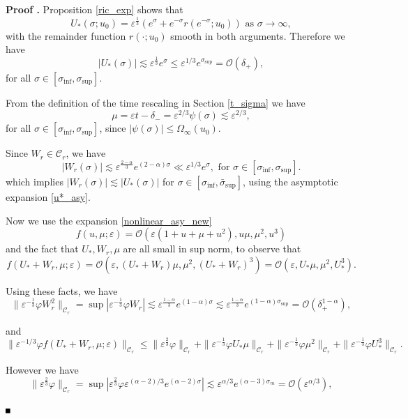 \documentclass[letterpaper,11pt]{article}
\newcommand{\rmO}{\mathcal{O}}
\newcommand{\eps}{\varepsilon}
\newcommand{\lar}{ \lesssim }
\numberwithin{equation}{section}
\theoremstyle{plain}
\newenvironment{Proof}[1][\unskip]%
 {\begin{trivlist} \item[]{\bf Proof #1. }}%
 {\hspace*{\fill}$\rule{.4\baselineskip}{.4\baselineskip}$\end{trivlist}}
\begin{document}
\begin{Proof} Proposition \ref{ric_exp} shows that
\begin{equation} \label{u*_asy}
U_*(\sigma;u_0) =  \eps^{\frac{1}{3}}(e^\sigma+e^{-\sigma} r(e^{-\sigma}; u_0)   ) \text{ as }\sigma \to \infty,
\end{equation}
with the remainder function $r(\cdot;u_0)$ smooth in both arguments.
Therefore we have
\[
|U_*(\sigma)| \lar \eps^{\frac{1}{3}}e^\sigma \le \eps^{1/3}e^{\sigma_{\sup}} = \rmO(\delta_+),
\]
for all $\sigma \in [\sigma_{\inf},\sigma_{\sup}]$.

From the definition of the time rescaling in Section \ref{t_sigma} we have
\[
\mu = \eps t-\delta_-  =\eps^{2/3}\psi(\sigma) \lar \eps^{2/3},
\]
for all $\sigma \in [\sigma_{\inf},\sigma_{\sup}]$, since $|\psi(\sigma)| \le \Omega_\infty(u_0)$.

Since $W_r \in \mathcal{C}_r$, we have 
\[
|W_r(\sigma)| \lar \eps^{\frac{2-\alpha}{3}} e^{(2-\alpha)\sigma} \ll \eps^{1/3}e^\sigma, \text{ for } \sigma \in [\sigma_{\inf}, \sigma_{\sup}].
\]
which implies $|W_r(\sigma)| \lar |U_*(\sigma)|$ for $\sigma \in [\sigma_{\inf}, \bar{\sigma}_{\sup}]$, using the asymptotic expansion \eqref{u*_asy}.

Now we use the expansion \eqref{nonlinear_asy_new}
\[
f(u,\mu; \eps) = \rmO(\eps(1+u+\mu+u^2),u\mu,\mu^2,u^3)
\] 
and the fact that $U_*,W_r,\mu$ are all small in sup norm, to observe that
\begin{equation}\label{nonlinear_asy:fr}
f(U_*+W_r, \mu ;\eps) = \rmO(\eps, (U_*+W_r)\mu, \mu^2, (U_*+W_r)^3 ) = \rmO(\eps, U_*\mu, \mu^2, U_*^3).
\end{equation}

Using these facts, we have
\begin{equation}\label{nl_est:Rr_1}
\|\eps^{-\frac{1}{3}}\varphi W_r^2\|_{\mathcal{C}_r}=\sup |\eps^{-\frac{1}{3}} \varphi W_r| \lar \eps^{\frac{1-\alpha}{3}} e^{(1-\alpha)\sigma} \lar \eps^{\frac{1-\alpha}{3}} e^{(1-\alpha)\sigma_{\sup}} =  \rmO(\delta^{1-\alpha}_+),
\end{equation}

and
\[
\|\eps^{-1/3}\varphi f(U_*+W_r, \mu ;\eps)\|_{\mathcal{C}_r} \le \|\eps^{\frac{2}{3}}\varphi  \|_{\mathcal{C}_r}+\|\eps^{-\frac{1}{3}}\varphi U_*\mu \|_{\mathcal{C}_r}+\|\eps^{-\frac{1}{3}}\varphi \mu^2 \|_{\mathcal{C}_r}+\|\eps^{-\frac{1}{3}}\varphi U_*^3\|_{\mathcal{C}_r}.
\]

However we have
\[
\|\eps^{\frac{2}{3}}\varphi \|_{\mathcal{C}_r}=\sup |\eps^{\frac{2}{3}} \varphi   \eps^{(\alpha-2)/3}e^{(\alpha-2)\sigma}| \lar \eps^{\alpha/3} e^{(\alpha-3)\sigma_m} = \rmO(\eps^{\alpha/3}) ,
\]


\end{Proof}
\end{document}
